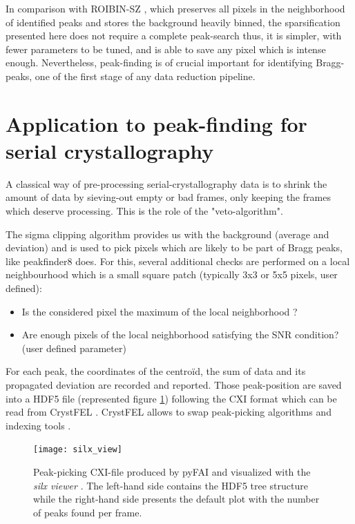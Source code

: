 \documentclass[preprint]{iucr}              %
\begin{document}
In comparison with ROIBIN-SZ \cite{roibin}, which preserves all pixels in the neighborhood of identified peaks and stores the background heavily binned, the sparsification presented here does not require a complete peak-search thus, it is simpler, with fewer parameters to be tuned, and is able to save any pixel which is intense enough.
Nevertheless, peak-finding is of crucial important for identifying Bragg-peaks, one of the first stage of any data reduction pipeline.

\section{Application to peak-finding for serial crystallography}
A classical way of pre-processing serial-crystallography data is to shrink the amount of data by sieving-out empty or bad frames, only keeping the frames which deserve processing. 
This is the role of the "veto-algorithm".

The sigma clipping algorithm provides us with the background (average and deviation) and is used to pick pixels which are likely to be part of Bragg peaks, like peakfinder8 \cite{Cheetah2014} does. 
For this, several additional checks are performed on a local neighbourhood which is a small square patch (typically 3x3 or 5x5 pixels, user defined):
\begin{itemize}
\item Is the considered pixel the maximum of the local neighborhood ?
\item Are enough pixels of the local neighborhood satisfying the SNR condition? (user defined parameter)
\end{itemize}

For each peak, the coordinates of the centroïd, the sum of data and its propagated deviation are recorded and reported. 
Those peak-position are saved into a HDF5 file (represented figure \ref{silx}) following the CXI format \cite{cxi} which can be read from CrystFEL \cite{CrystFEL}.
CrystFEL allows to swap peak-picking algorithms \cite{zaefferer, Cheetah2014, robustpeakfinder} and indexing tools \cite{xds, mosflm, taketwo, xgandalf, pinkindexer}.

\begin{figure}
\label{silx}
\texttt{[image: silx\_view]}
\caption{Peak-picking CXI-file produced by pyFAI and visualized with the \textit{silx viewer} \cite{silx}.
The left-hand side contains the HDF5 tree structure while the right-hand side presents the default plot with the number of peaks found per frame.}
\end{figure}
\end{document}
